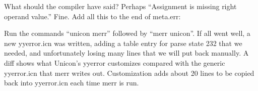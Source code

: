 \documentclass[letterpaper]{article}
\begin{document}
What should the compiler have said?  Perhaps ``Assignment is missing
right operand value.'' Fine.  Add all this to the end of meta.err:


Run the commands ``unicon merr'' followed by ``merr unicon''. If all
went well, a new yyerror.icn was written, adding a table entry for
parse state 232 that we needed, and unfortunately losing many lines
that we will put back manually. A diff shows what Unicon's yyerror
customizes compared with the generic yyerror.icn that merr writes out.
Customization adds about 20 lines to be copied back into yyerror.icn
each time merr is run.
\end{document}
